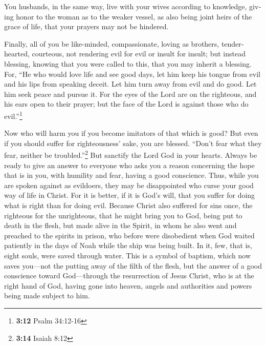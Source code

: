 \begin{paracol}{2}
\begin{otherlanguage}{english}
 You husbands, in the same way, live with your wives
according to knowledge, giving honor to the woman as to the weaker
vessel, as also being joint heirs of the grace of life, that your
prayers may not be hindered.

 Finally, all of you be like-minded, compassionate, loving
as brothers, tenderhearted, courteous,  not rendering evil
for evil or insult for insult; but instead blessing, knowing that you
were called to this, that you may inherit a blessing. 
For, ``He who would love life and see good days, let him keep his tongue
from evil and his lips from speaking deceit.  Let him
turn away from evil and do good. Let him seek peace and pursue it.
 For the eyes of the Lord are on the righteous, and his
ears open to their prayer; but the face of the Lord is against those who
do evil.''\footnote{\textbf{3:12} Psalm 34:12-16}

 Now who will harm you if you become imitators of that
which is good?  But even if you should suffer for
righteousness' sake, you are blessed. ``Don't fear what they fear,
neither be troubled.''\footnote{\textbf{3:14} Isaiah 8:12}
 But sanctify the Lord God in your hearts. Always be
ready to give an answer to everyone who asks you a reason concerning the
hope that is in you, with humility and fear,  having a
good conscience. Thus, while you are spoken against as evildoers, they
may be disappointed who curse your good way of life in Christ.
 For it is better, if it is God's will, that you suffer
for doing what is right than for doing evil.  Because
Christ also suffered for sins once, the righteous for the unrighteous,
that he might bring you to God, being put to death in the flesh, but
made alive in the Spirit,  in whom he also went and
preached to the spirits in prison,  who before were
disobedient when God waited patiently in the days of Noah while the ship
was being built. In it, few, that is, eight souls, were saved through
water.  This is a symbol of baptism, which now saves
you---not the putting away of the filth of the flesh, but the answer of
a good conscience toward God---through the resurrection of Jesus Christ,
 who is at the right hand of God, having gone into
heaven, angels and authorities and powers being made subject to him.

\end{otherlanguage}


\end{paracol}
